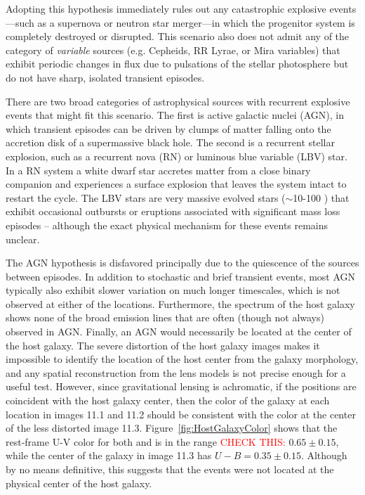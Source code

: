 Adopting this hypothesis immediately rules out any catastrophic
explosive events---such as a supernova or neutron star merger---in
which the progenitor system is completely destroyed or disrupted. This
scenario also does not admit any of the category of {\it variable}
sources (e.g. Cepheids, RR Lyrae, or Mira variables) that exhibit
periodic changes in flux due to pulsations of the stellar photosphere
but do not have sharp, isolated transient episodes.

There are two broad categories of astrophysical sources with
recurrent explosive events that might fit this scenario.  The first is
active galactic nuclei (AGN), in which transient episodes can be
driven by clumps of matter falling onto the accretion disk of a
supermassive black hole.  The second is a recurrent stellar explosion,
such as a recurrent nova (RN) or luminous blue variable (LBV) star.
In a RN system a white dwarf star accretes matter from a close binary
companion and experiences a surface explosion that leaves the system
intact to restart the cycle.  The LBV stars are very massive evolved
stars ($\sim$10-100 \Msun) that exhibit occasional outbursts or
eruptions associated with significant mass loss episodes -- although
the exact physical mechanism for these events remains unclear.

The AGN hypothesis is disfavored principally due to the quiescence of
the \spock sources between episodes. In addition to stochastic and
brief transient events, most AGN typically also exhibit slower
variation on much longer timescales, which is not observed at either
of the \spock locations. Furthermore, the spectrum of the \spock host
galaxy shows none of the broad emission lines that are often (though
not always) observed in AGN.  Finally, an AGN would necessarily be
located at the center of the host galaxy. The severe distortion of the
host galaxy images makes it impossible to identify the location of the
host center from the galaxy morphology, and any spatial reconstruction
from the lens models is not precise enough for a useful test.
However, since gravitational lensing is achromatic, if the \spock
positions are coincident with the host galaxy center, then the color
of the galaxy at each \spock location in images 11.1 and 11.2 should
be consistent with the color at the center of the less distorted image
11.3.  Figure~\ref{fig:HostGalaxyColor} shows that the rest-frame U-V
color for both \spockone and \spocktwo is in the range
\textcolor{red}{CHECK THIS:} $0.65\pm0.15$, while the center of the
galaxy in image 11.3 has $U-B=0.35\pm0.15$. Although by no means
definitive, this suggests that the \spock events were not located at
the physical center of the host galaxy.





